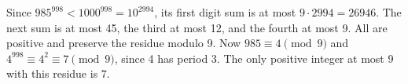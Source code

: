 Since $985^{998}<1000^{998}=10^{2994}$, its first digit sum is at most $9\cdot2994=26946$. The next sum is at most 45, the third at most 12, and the fourth at most 9. All are positive and preserve the residue modulo 9. Now $985\equiv4\pmod9$ and $4^{998}\equiv4^2\equiv7\pmod9$, since 4 has period 3. The only positive integer at most 9 with this residue is $\boxed7$.
